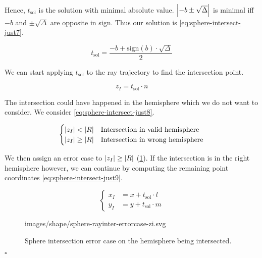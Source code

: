 Hence, $t_\textrm{sol}$ is the solution with minimal absolute value.
$\abs{-b \pm \sqrt{\Delta}}$ is minimal iff
$-b$ and $\pm \sqrt{\Delta}$ are opposite in sign. Thus our
solution is \cref{eq:sphere-intersect-just7}.

\begin{equation} \label{eq:sphere-intersect-just7}
t_\textrm{sol} = \frac{-b + \textrm{sign}(b) \cdot \sqrt{\Delta}}{2}
\end{equation}

We can start applying $t_\textrm{sol}$ to the ray trajectory to find
the intersection point.

\begin{equation}
z_I = t_\textrm{sol} \cdot n
\end{equation}

The intersection could have happened in the hemisphere which we do
not want to consider. We consider \cref{eq:sphere-intersect-just8}.

\begin{equation} \label{eq:sphere-intersect-just8}
\begin{cases}
\abs{z_I} < \abs{R} & \text{Intersection in valid hemisphere} \\
\abs{z_I} \geq \abs{R} & \text{Intersection in wrong hemisphere}
\end{cases}
\end{equation}

We then assign an error case to $\abs{z_I} \geq \abs{R}$
(\cref{fig:sphere-inter-error-zi}).  If the intersection is in the right
hemisphere however, we can continue by computing the remaining point
coordinates \cref{eq:sphere-intersect-just9}.

\begin{equation} \label{eq:sphere-intersect-just9}
\begin{cases}
x_I &= x + t_\textrm{sol} \cdot l \\
y_I &= y + t_\textrm{sol} \cdot m
\end{cases} \end{equation}

\begin{figure} \caption{\label{fig:sphere-inter-error-zi} Sphere intersection
error case on the hemisphere being intersected.}

           {images/shape/sphere-rayinter-errorcase-zi.svg}
\end{figure}

$\square$


